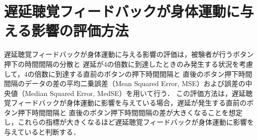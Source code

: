 \section{遅延聴覚フィードバックが身体運動に与える影響の評価方法}
遅延聴覚フィードバックが身体運動に与える影響の評価は，被験者が行うボタン押下の時間間隔の分散と
遅延が4の倍数に到達したときのみ発生する状況を考慮して，4の倍数に到達する直前のボタンの押下時間間隔と
直後のボタン押下時間間隔のデータの差の平均二乗誤差（Mean Squared Error, MSE）および誤差の中央値（Median Squared Error, MedSE）を用いて行う．
この評価方法は，遅延聴覚フィードバックが身体運動に影響を与えている場合，遅延が発生する直前のボタン押下時間間隔と
直後のボタン押下時間間隔の差が大きくなることを想定し，これらの指標が大きくなるほど遅延聴覚フィードバックが身体運動に影響を与えていると判断する．
